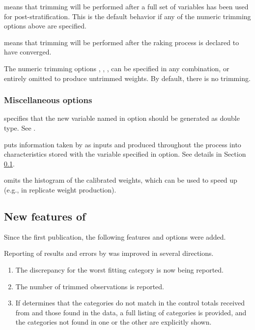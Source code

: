 \morehang {} means that trimming will be performed
    after a full set of variables has been used for post-stratification.
    This is the default behavior if any of the numeric trimming
    options above are specified.

\morehang {}
    means that trimming will be performed after the raking process
    is declared to have converged.

The numeric trimming options , ,
,  can be specified in any combination,
or entirely omitted to produce untrimmed weights. By default, there is no trimming.

\subsubsection{Miscellaneous options}

\hangpara
{} specifies that the new variable named in 
option should be generated as double type. See .

\hangpara
{} puts information taken by  as inputs and produced
    throughout the process into characteristics stored with the variable specified in
     option. See details in Section \ref{subsec:example:meta}.

\hangpara
{} omits the histogram of the calibrated weights, which can be
used to speed up  (e.g., in replicate weight production).

\subsection{New features of }
\label{subsec:example:meta}

Since the first publication, the following features and options were added.

Reporting of results and errors by  was improved in several directions.
\begin{enumerate}
    \item The discrepancy for the worst fitting category is now being reported.
    \item The number of trimmed observations is reported.
    \item If  determines that the categories do not match
        in the control totals received from  and those found in
        the data, a full listing of categories is provided, and the categories
        not found in one or the other are explicitly shown.
\end{enumerate}

